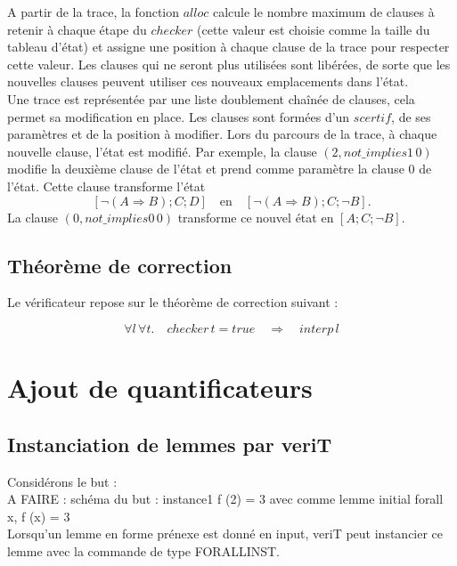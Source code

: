 \documentclass[11pt]{article}
\begin{document}
A partir de la trace, la fonction $alloc$ calcule le nombre maximum de clauses à retenir à chaque étape du $checker$ (cette valeur est choisie comme la taille du tableau d'état) et assigne une position à chaque clause de la trace pour respecter cette valeur. Les clauses qui ne seront plus utilisées sont libérées, de sorte que les nouvelles clauses peuvent utiliser ces nouveaux emplacements dans l'état. \\

Une trace est représentée par une liste doublement chaînée de clauses, cela permet sa modification en place. Les clauses sont formées d'un $scertif$, de ses paramètres et de la position à modifier. Lors du parcours de la trace, à chaque nouvelle clause, l'état est modifié. Par exemple, la clause $(2, not\_implies1 \, 0)$ modifie la deuxième clause de l'état et prend comme paramètre la clause $0$ de l'état. Cette clause transforme l'état 
\[    [\neg (A \Rightarrow B);  C; D] \quad \text{en} \quad [\neg (A \Rightarrow B);  C; \neg B]. \]
La clause $(0, not\_implies0 \, 0)$ transforme ce nouvel état en $[A; C; \neg B]$. \\


\subsection{Théorème de correction}

Le vérificateur repose sur le théorème de correction suivant :

\[ \forall l \, \forall t. \quad checker \, t = true \quad \Rightarrow \quad interp \, l \]







\newpage
\section{Ajout de quantificateurs}

\subsection{Instanciation de lemmes par veriT}

Considérons le but : \\

A FAIRE : schéma du but : instance1 f (2) = 3 avec comme lemme initial forall x, f (x) = 3 \\

Lorsqu'un lemme en forme prénexe est donné en input, veriT peut instancier ce lemme avec la commande de type FORALLINST. \\
\end{document}
